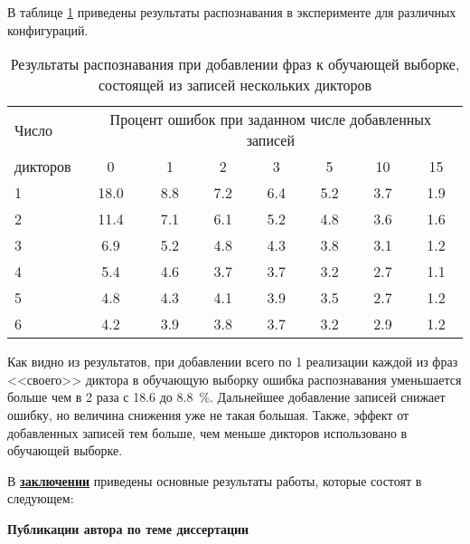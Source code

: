 В таблице \ref{tab:4_3} приведены результаты распознавания в эксперименте для различных конфигураций.
\begin{table}[h]
	\centering
	\caption{Результаты распознавания при добавлении фраз к обучающей выборке, состоящей из записей нескольких дикторов}
	\label{tab:4_3}
	\begin{tabular}{| l | c | c | c | c | c | c | c |}
		\hline
		Число & \multicolumn{7}{c|}{Процент ошибок при заданном числе добавленных записей} \\
		\hhline{~-------}
		дикторов & \phantom{00}0\phantom{00} & \phantom{00}1\phantom{00} & \phantom{00}2\phantom{00} & \phantom{00}3\phantom{00} & \phantom{00}5\phantom{00} & \phantom{00}10\phantom{00} & \phantom{00}15\phantom{00} \\
		\hline
		1 		 & 18.0 & 8.8 & 7.2 & 6.4 & 5.2 & 3.7 & 1.9 \\
		2 		 & 11.4 & 7.1 & 6.1 & 5.2 & 4.8 & 3.6 & 1.6 \\
		3 		 &  6.9 & 5.2 & 4.8 & 4.3 & 3.8 & 3.1 & 1.2 \\
		4 		 &  5.4 & 4.6 & 3.7 & 3.7 & 3.2 & 2.7 & 1.1 \\
		5 		 &  4.8 & 4.3 & 4.1 & 3.9 & 3.5 & 2.7 & 1.2 \\
		6 		 &  4.2 & 3.9 & 3.8 & 3.7 & 3.2 & 2.9 & 1.2 \\
		\hline
	\end{tabular}
\end{table}

Как видно из результатов, при добавлении всего по 1 реализации каждой из фраз <<своего>> диктора в обучающую выборку ошибка распознавания уменьшается больше чем в 2 раза с 18.6 до 8.8~\%.
Дальнейшее добавление записей снижает ошибку, но величина снижения уже не такая большая.
Также, эффект от добавленных записей тем больше, чем меньше дикторов использовано в обучающей выборке.

В \underline{\textbf{заключении}} приведены основные результаты работы, которые состоят в следующем:



\begin{center}
	{\fontsize{11}{13}\selectfont \textbf{Публикации автора по теме диссертации}}
\end{center} 

